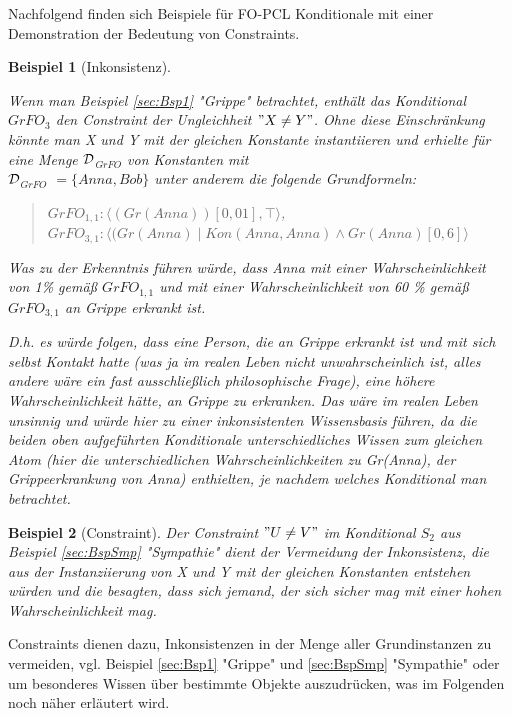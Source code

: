 \documentclass[a4paper, 11pt]{book}
\newtheorem{Bsp}{Beispiel}[section]
\begin{document}
Nachfolgend finden sich Beispiele für FO-PCL Konditionale mit einer Demonstration der Bedeutung von Constraints. 
\begin{Bsp}[Inkonsistenz]
\label{sec:Bsp}

Wenn man Beispiel \ref{sec:Bsp1} "{}Grippe"{} betrachtet, enthält das Konditional $ GrFO_{3}$ den Constraint der Ungleichheit $ "{} X \neq Y "{} $. Ohne diese Einschränkung könnte man X und Y mit der gleichen Konstante instantiieren und erhielte  für eine Menge $ \cal D $$_{GrFO} $ von Konstanten mit\\
 $ \cal D $$_{GrFO}  $ $ = \{Anna, Bob \} $ unter anderem die folgende Grundformeln:\\
 \begin{quote}
 	$ GrFO_{1, 1}  :  \langle (Gr(Anna))[0,01], \top \rangle $,\\
 	$ GrFO_{3, 1} : \langle (Gr(Anna) \mid Kon(Anna, Anna) \wedge Gr(Anna)[0,6]  \rangle$\\
 \end{quote}
  Was zu der Erkenntnis führen würde, dass Anna mit einer Wahrscheinlichkeit von 1\% gemäß  $ GrFO_{1, 1}  $ und mit einer Wahrscheinlichkeit von 60 \% gemäß $ GrFO_{3, 1}  $ an Grippe erkrankt ist. 
  
 D.h. es würde folgen, dass eine Person, die an Grippe erkrankt ist und mit sich selbst Kontakt hatte (was ja im realen Leben nicht unwahrscheinlich ist, alles andere wäre ein fast ausschließlich philosophische Frage), eine höhere Wahrscheinlichkeit hätte, an Grippe zu erkranken. Das wäre im realen Leben unsinnig und würde hier zu einer inkonsistenten Wissensbasis führen, da die beiden oben aufgeführten Konditionale unterschiedliches Wissen zum gleichen Atom (hier die unterschiedlichen Wahrscheinlichkeiten zu Gr(Anna), der Grippeerkrankung von Anna) enthielten, je nachdem welches Konditional man betrachtet. 



\end{Bsp}

\begin{Bsp}[Constraint]
\label{sec:BspConstraint}
Der Constraint $ "{} U \neq V "{} $ im Konditional $ S_{2} $ aus Beispiel \ref{sec:BspSmp} "{}Sympathie"{} dient der Vermeidung der Inkonsistenz, die aus der Instanziierung von X und Y mit der gleichen Konstanten entstehen würden und die besagten, dass sich jemand, der sich sicher mag mit einer hohen Wahrscheinlichkeit mag. 
\end{Bsp}
Constraints dienen dazu, Inkonsistenzen in der Menge aller Grundinstanzen zu vermeiden, vgl. Beispiel \ref{sec:Bsp1} "{}Grippe"{}  und \ref{sec:BspSmp} "{}Sympathie"{} oder um besonderes Wissen über bestimmte Objekte auszudrücken, was im Folgenden noch näher erläutert wird.
\end{document}
